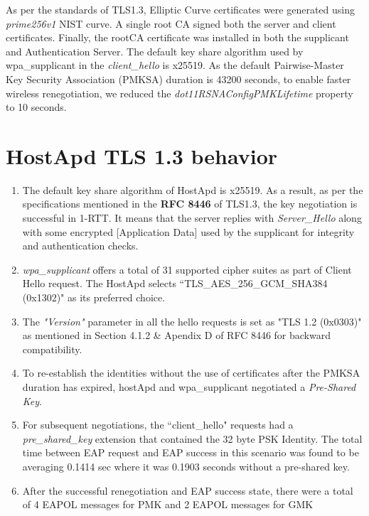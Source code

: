 \documentclass[12pt]{article}
\begin{document}
As per the standards of TLS1.3, Elliptic Curve certificates were generated using \emph{prime256v1} NIST curve. A single root CA signed both the server and client certificates. Finally, the rootCA certificate was installed in both the supplicant and Authentication Server. The default key share algorithm used by wpa\_supplicant in the \emph{client\_hello} is x25519. As the default Pairwise-Master Key Security Association (PMKSA) duration is 43200 seconds, to enable faster wireless renegotiation, we reduced the \emph{dot11RSNAConfigPMKLifetime} property to 10 seconds.  

\section{HostApd TLS 1.3 behavior}

\begin{enumerate}
	\item{The default key share algorithm of HostApd is x25519. As a result, as per the specifications mentioned in the \textbf{RFC 8446} of TLS1.3, the key negotiation is successful in 1-RTT. It means that the server replies with \emph{Server\_Hello} along with some encrypted [Application Data] used by the supplicant for integrity and authentication checks.}
	\item{\emph{wpa\_supplicant} offers a total of 31 supported cipher suites as part of Client Hello request. The HostApd selects ``TLS\_AES\_256\_GCM\_SHA384 (0x1302)" as its preferred choice. 
	  }
	\item{The \emph{"Version"} parameter in all the hello requests is set as "TLS 1.2 (0x0303)" as mentioned in Section 4.1.2 \& Apendix D of RFC 8446 for backward compatibility.}
	\item{To re-establish the identities without the use of certificates after the PMKSA duration has expired, hostApd and wpa\_supplicant negotiated a \emph{Pre-Shared Key}.}
	\item{For subsequent negotiations, the ``client\_hello" requests had a \emph{pre\_shared\_key} extension that contained the 32 byte PSK Identity. The total time between EAP request and EAP success in this scenario was found to be averaging 0.1414 sec where it was 0.1903 seconds without a pre-shared key.  }
	\item{After the successful renegotiation and EAP success state, there were a total of 4 EAPOL messages for PMK and 2 EAPOL messages for GMK}

	
\end{enumerate}
\end{document}
